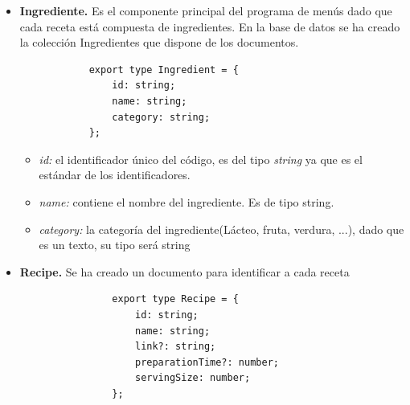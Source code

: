 \documentclass[12pt,a4paper]{report} %
\begin{document}
	\begin{itemize}
		\item \textbf{Ingrediente.} Es el componente principal del programa de menús dado que cada receta está compuesta de ingredientes. En la base de datos se ha creado la colección Ingredientes que dispone de los documentos.
		\\
		\begin{lstlisting}
			export type Ingredient = {
				id: string;
				name: string;
				category: string;
			};
		\end{lstlisting}
		
		\begin{itemize}
			\item \textit{id:} el identificador único del código, es del tipo \textit{string} ya que es el estándar de los identificadores.
			\item \textit{name:} contiene el nombre del ingrediente. Es de tipo string.
			\item \textit{category:} la categoría del ingrediente(Lácteo, fruta, verdura, ...), dado que es un texto, su tipo será string
		\end{itemize}
		\item \textbf{Recipe.} Se ha creado un documento para identificar a cada receta
			\\
			\begin{lstlisting}
				export type Recipe = {
					id: string;
					name: string;
					link?: string;
					preparationTime?: number;
					servingSize: number;
				};
			\end{lstlisting}
			

\end{itemize}
\end{document}
